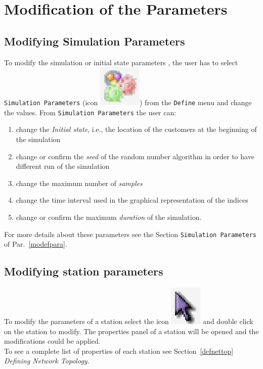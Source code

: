 \section{Modification of the Parameters}
\label{modifpa}

\subsection{Modifying Simulation Parameters}
To modify the simulation or initial state parameters , the user
has to select \texttt{Simulation Parameters} (icon
\includegraphics[scale=.4]{img/jsimg/defineSimulationParameters.eps})
from the \texttt{Define} menu and change the values. From
\texttt{Simulation Parameters} the user can:
\begin{enumerate} \item change the \emph{Initial state}, i.e., the location
of the customers at the beginning of the simulation \item change
or confirm the \emph{seed} of the random number algorithm in order
to have different run of the simulation \item change the maximum
number of \emph{samples} \item change the time interval used in
the graphical representation of the indices \item change or
confirm the maximum \emph{duration} of the simulation.
\end{enumerate}

\noindent For more details about these parameters see the Section
\texttt{Simulation Parameters} of Par.~\ref{modefpara}.

\subsection{Modifying station parameters}
 To modify the
parameters of a station select the icon
\includegraphics[scale=.5]{img/jsimg/select} and double
click on the station to modify. The properties panel of a station
will be opened and the modifications could be applied.\\
To see a complete list of properties of each station see
Section~\ref{defnettop} \emph{Defining Network Topology}.

